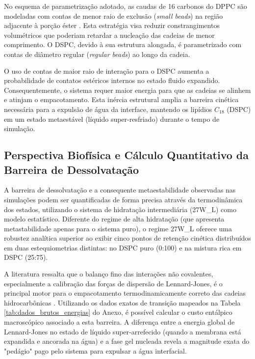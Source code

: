 \documentclass[12pt]{article} %
\begin{document}
No esquema de parametrização adotado, as caudas de 16 carbonos do DPPC são modeladas com contas de menor raio de exclusão (\textit{small beads}) na região adjacente à porção éster \cite{marrink2022}. Esta estratégia visa reduzir constrangimentos volumétricos que poderiam retardar a nucleação das cadeias de menor comprimento. O DSPC, devido à sua estrutura alongada, é parametrizado com contas de diâmetro regular (\textit{regular beads}) ao longo da cadeia.

O uso de contas de maior raio de interação para o DSPC \cite{liu2012} aumenta a probabilidade de contatos estéricos internos no estado fluido expandido. Consequentemente, o sistema requer maior energia para que as cadeias se alinhem e atinjam o empacotamento. Esta inércia estrutural amplia a barreira cinética necessária para a expulsão de água da interface, mantendo os lipídios $C_{18}$ (DSPC) em um estado metaestável (líquido super-resfriado) durante o tempo de simulação.


\subsection{Perspectiva Biofísica e Cálculo Quantitativo da Barreira de Dessolvatação}

A barreira de dessolvatação e a consequente metaestabilidade observadas nas simulações podem ser quantificadas de forma precisa através da termodinâmica dos estados, utilizando o sistema de hidratação intermediária (27W\_L) como modelo estatístico. Diferente do regime de alta hidratação (que apresenta metastabilidade apenas para o sistema puro), o regime 27W\_L oferece uma robustez analítica superior ao exibir cinco pontos de retenção cinética distribuídos em duas estequiometrias distintas: no DSPC puro (0:100) e na mistura rica em DSPC (25:75).

A literatura ressalta que o balanço fino das interações não covalentes, especialmente a calibração das forças de dispersão de Lennard-Jones, é o principal motor para o empacotamento termodinamicamente correto das cadeias hidrocarbônicas \cite{liu2012}. Utilizando os dados exatos de transição mapeados na Tabela \ref{tab:dados_brutos_energias} do Anexo, é possível calcular o custo entálpico macroscópico associado a esta barreira. A diferença entre a energia global de Lennard-Jones no estado de líquido super-arrefecido (quando a membrana está expandida e ancorada na água) e a fase gel nucleada revela a magnitude exata do "pedágio" pago pelo sistema para expulsar a água interfacial.
\end{document}

